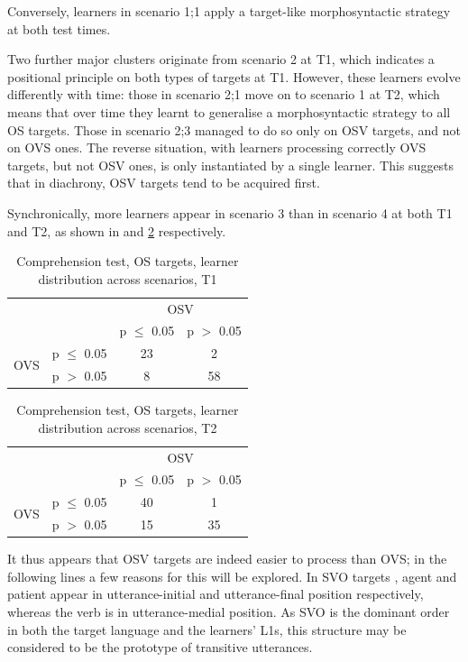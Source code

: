 Conversely, learners in scenario 1;1 apply a target-like morphosyntactic strategy at both test times. 

Two further major clusters originate from scenario 2 at T1, which indicates a positional principle on both types of targets at T1. However, these learners evolve differently with time: those in scenario 2;1 move on to scenario 1 at T2, which means that over time they learnt to generalise a morphosyntactic strategy to all OS targets. Those in scenario 2;3 managed to do so only on OSV targets, and not on OVS ones. The reverse situation, with learners processing correctly OVS targets, but not OSV ones, is only instantiated by a single learner. This suggests that in diachrony, OSV targets tend to be acquired first.

Synchronically, more learners appear in scenario 3 than in scenario 4 at both T1 and T2, as shown in  and \ref{tab:05:8} respectively.

\begin{table}
    \begin{tabular}{|lc|cc|}
    \hline
    & & \multicolumn{2}{c|}{OSV}\\
    &  & p ${\leq}$ 0.05 & p $>$ 0.05\\
    \hline
    \multirow{2}{*}{OVS} & p ${\leq}$ 0.05 & 23 & 2\\
    & p $>$ 0.05 & 8 & 58\\
    \hline
    \end{tabular}
    \caption{Comprehension test, OS targets, learner distribution across scenarios, T1}
    \label{tab:05:7}
\end{table}

\begin{table}
    \begin{tabular}{|lc|cc|}
    \hline
    & & \multicolumn{2}{c|}{OSV}\\
    &  & p ${\leq}$ 0.05 & p $>$ 0.05\\
    \hline
    \multirow{2}{*}{OVS}& p ${\leq}$ 0.05 & 40 & 1\\
    & p $>$ 0.05 & 15 & 35\\
    \hline
    \end{tabular}
    \caption{Comprehension test, OS targets, learner distribution across scenarios, T2}
    \label{tab:05:8}
\end{table}

It thus appears that OSV targets are indeed easier to process than OVS; in the following lines a few reasons for this will be explored. In SVO targets , agent and patient appear in utterance-initial and utterance-final position respectively, whereas the verb is in utterance-medial position. As SVO is the dominant order in both the target language and the learners' L1s, this structure may be considered to be the prototype of transitive utterances. 

